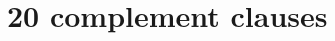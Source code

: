\documentclass[11pt,fleqn]{article}
\newcommand{\6}{\mbox{$[\hspace*{-.6mm}[$}}
\newcommand{\9}{\mbox{$]\hspace*{-.6mm}]$}}
\begin{document}
{%
%
%
%
%
%
%
%
%
%
%
%

\section{20 complement clauses}\label{a-clauses}

}
\end{document}

